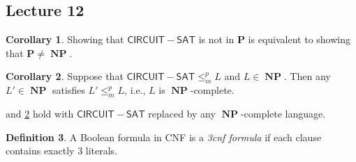 \documentclass[10pt,letterpaper,cm]{nupset}
\theoremstyle{definition}
\newtheorem{definition}{Definition}[subsection]
\theoremstyle{theorem}
\newtheorem{corollary}[definition]{Corollary}
\theoremstyle{remark}
\newcommand{\1}{\mathbf{1}}
\newcommand{\0}{\vec 0}
\DeclareMathOperator{\NP}{\mathbf{NP}}
\begin{document}
\subsection{Lecture 12}

\begin{corollary}\label{cc1}
Showing that $\mathsf{CIRCUIT{-}SAT}$ is not in $\mathbf{P}$ is equivalent to showing that $\mathbf{P} \ne \NP$.
\end{corollary}

\begin{corollary}\label{cc2}
Suppose that $\mathsf{CIRCUIT{-}SAT} \leq_m^p L$ and $L\in \NP$. Then any $L' \in \NP$ satisfies $L' \leq_m^p L$, i.e., $L$ is $\NP$-complete.
\end{corollary}

\smallskip

 and \cref{cc2} hold with $\mathsf{CIRCUIT{-}SAT}$ replaced by any $\NP$-complete language. 

\smallskip

\begin{definition}
A Boolean formula in CNF is a \textit{3cnf formula} if each clause contains exactly $3$ literals.  
\end{definition}
\end{document}
